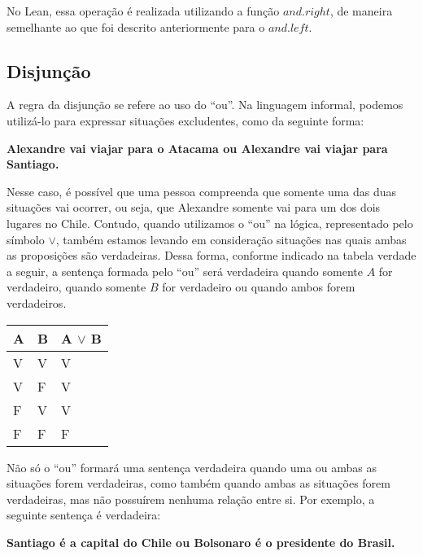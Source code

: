 No Lean, essa operação é realizada utilizando a função $and.right$, de maneira semelhante ao que foi descrito anteriormente para o $and.left$. 

\subsection{Disjunção}

A regra da disjunção se refere ao uso do ``ou''. Na linguagem informal, podemos utilizá-lo para expressar situações excludentes, como da seguinte forma:
\begin{center}
\textbf{Alexandre vai viajar para o Atacama ou Alexandre vai viajar para Santiago.}\\
\end{center}
Nesse caso, é possível que uma pessoa compreenda que somente uma das duas situações vai ocorrer, ou seja, que Alexandre somente vai para um dos dois lugares no Chile. Contudo, quando utilizamos o  ``ou'' na lógica, representado pelo símbolo $\lor$, também estamos levando em consideração situações nas quais ambas as proposições são verdadeiras. Dessa forma, conforme indicado na tabela verdade a seguir, a sentença formada pelo ``ou'' será verdadeira quando somente $A$ for verdadeiro, quando somente $B$ for verdadeiro ou quando ambos forem verdadeiros. 

\begin{table}[htb]
\centering
\begin{tabular}{|l|l|l|}
\hline
\textbf{A} & \textbf{B} & \textbf{A $\lor$ B} \\ \hline
V          & V          & V                 \\ \hline
V          & F          & V                 \\ \hline
F          & V          & V                 \\ \hline
F          & F          & F                 \\ \hline
\end{tabular}
\end{table}

Não só o ``ou'' formará uma sentença verdadeira quando uma ou ambas as situações forem verdadeiras, como também quando ambas as situações forem verdadeiras, mas não possuírem nenhuma relação entre si. Por exemplo, a seguinte sentença é verdadeira: 
\begin{center}
\textbf{Santiago é a capital do Chile ou Bolsonaro é o presidente do Brasil.}\\
\end{center}

